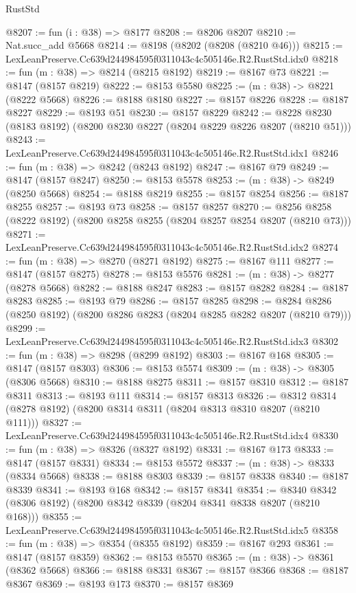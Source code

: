 \begin{lexlean}{RustStd}
\begin{coremodule}
@8207 := fun (i : @38) => @8177
@8208 := @8206 @8207
@8210 := Nat.succ_add @5668
@8214 := @8198 (@8202 (@8208 (@8210 @46)))
@8215 := LexLeanPreserve.Cc639d244984595f0311043c4c505146e.R2.RustStd.idx0
@8218 := fun (m : @38) => @8214 (@8215 @8192)
@8219 := @8167 @73
@8221 := @8147 (@8157 @8219)
@8222 := @8153 @5580
@8225 := (m : @38) -> @8221 (@8222 @5668)
@8226 := @8188 @8180
@8227 := @8157 @8226
@8228 := @8187 @8227
@8229 := @8193 @51
@8230 := @8157 @8229
@8242 := @8228 @8230 (@8183 @8192) (@8200 @8230 @8227 (@8204 @8229 @8226 @8207 (@8210 @51)))
@8243 := LexLeanPreserve.Cc639d244984595f0311043c4c505146e.R2.RustStd.idx1
@8246 := fun (m : @38) => @8242 (@8243 @8192)
@8247 := @8167 @79
@8249 := @8147 (@8157 @8247)
@8250 := @8153 @5578
@8253 := (m : @38) -> @8249 (@8250 @5668)
@8254 := @8188 @8219
@8255 := @8157 @8254
@8256 := @8187 @8255
@8257 := @8193 @73
@8258 := @8157 @8257
@8270 := @8256 @8258 (@8222 @8192) (@8200 @8258 @8255 (@8204 @8257 @8254 @8207 (@8210 @73)))
@8271 := LexLeanPreserve.Cc639d244984595f0311043c4c505146e.R2.RustStd.idx2
@8274 := fun (m : @38) => @8270 (@8271 @8192)
@8275 := @8167 @111
@8277 := @8147 (@8157 @8275)
@8278 := @8153 @5576
@8281 := (m : @38) -> @8277 (@8278 @5668)
@8282 := @8188 @8247
@8283 := @8157 @8282
@8284 := @8187 @8283
@8285 := @8193 @79
@8286 := @8157 @8285
@8298 := @8284 @8286 (@8250 @8192) (@8200 @8286 @8283 (@8204 @8285 @8282 @8207 (@8210 @79)))
@8299 := LexLeanPreserve.Cc639d244984595f0311043c4c505146e.R2.RustStd.idx3
@8302 := fun (m : @38) => @8298 (@8299 @8192)
@8303 := @8167 @168
@8305 := @8147 (@8157 @8303)
@8306 := @8153 @5574
@8309 := (m : @38) -> @8305 (@8306 @5668)
@8310 := @8188 @8275
@8311 := @8157 @8310
@8312 := @8187 @8311
@8313 := @8193 @111
@8314 := @8157 @8313
@8326 := @8312 @8314 (@8278 @8192) (@8200 @8314 @8311 (@8204 @8313 @8310 @8207 (@8210 @111)))
@8327 := LexLeanPreserve.Cc639d244984595f0311043c4c505146e.R2.RustStd.idx4
@8330 := fun (m : @38) => @8326 (@8327 @8192)
@8331 := @8167 @173
@8333 := @8147 (@8157 @8331)
@8334 := @8153 @5572
@8337 := (m : @38) -> @8333 (@8334 @5668)
@8338 := @8188 @8303
@8339 := @8157 @8338
@8340 := @8187 @8339
@8341 := @8193 @168
@8342 := @8157 @8341
@8354 := @8340 @8342 (@8306 @8192) (@8200 @8342 @8339 (@8204 @8341 @8338 @8207 (@8210 @168)))
@8355 := LexLeanPreserve.Cc639d244984595f0311043c4c505146e.R2.RustStd.idx5
@8358 := fun (m : @38) => @8354 (@8355 @8192)
@8359 := @8167 @293
@8361 := @8147 (@8157 @8359)
@8362 := @8153 @5570
@8365 := (m : @38) -> @8361 (@8362 @5668)
@8366 := @8188 @8331
@8367 := @8157 @8366
@8368 := @8187 @8367
@8369 := @8193 @173
@8370 := @8157 @8369

\end{coremodule}
\end{lexlean}
